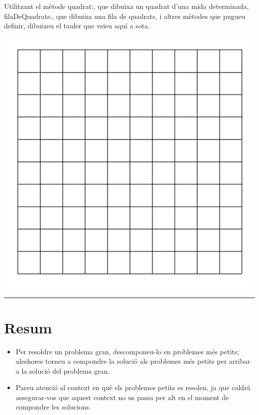 \begin{center}
\colorbox{black}{}
\end{center}
{\small
\noindent
Utilitzant el mètode \textsf{quadrat:}, que dibuixa un quadrat d'una mida determinada, \textsf{filaDeQuadrats:}, que dibuixa una fila de quadrats, i altres mètodes que pugueu definir, dibuixeu el tauler que veieu aquí a sota.}
\begin{center}
\includegraphics[scale=0.4]{Imatges/figuraE16-13.png} 
\end{center}
\noindent
\rule{\textwidth}{3pt}

\section{Resum}
\begin{itemize}
\item Per resoldre un problema gran, descomponeu-lo en problemes més petits; aleshores torneu a compondre la solució als problemes més petits per arribar a la solució del problema gran.
\item Pareu atenció al context en què els problemes petits es resolen, ja que caldrà assegurar-vos que aquest context no us passa per alt en el moment de compondre les solucions.
\end{itemize}

